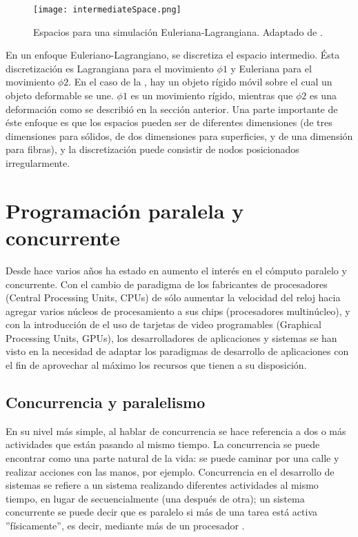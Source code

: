 \begin{figure}
	\centering
		\texttt{[image: intermediateSpace.png]}
	\caption[Espacios para una simulación Euleriana-Lagrangiana.]{Espacios para una simulación Euleriana-Lagrangiana. Adaptado de \citep{fan2013eulerian}.}
		\label{fig:intermediateSpace}
\end{figure}

En un enfoque Euleriano-Lagrangiano, se discretiza el espacio intermedio. Ésta discretización es Lagrangiana para el movimiento $\phi 1$ y Euleriana para el movimiento $\phi 2$. En el caso de la , hay un objeto rígido móvil sobre el cual un objeto deformable se une. $\phi 1$ es un movimiento rígido, mientras que $\phi 2$ es una deformación como se describió en la sección anterior. Una parte importante de éste enfoque es que los espacios pueden ser de diferentes dimensiones (de tres dimensiones para sólidos, de dos dimensiones para superficies, y de una dimensión para fibras), y la discretización puede consistir de nodos posicionados irregularmente. 

\section{Programación paralela y concurrente}

Desde hace varios años ha estado en aumento el interés en el cómputo paralelo y concurrente. Con el cambio de paradigma de los fabricantes de procesadores (Central Processing Units, CPUs) de sólo aumentar la velocidad del reloj hacia agregar varios núcleos de procesamiento a sus chips (procesadores multinúcleo), y con la introducción de el uso de tarjetas de video programables (Graphical Processing Units, GPUs), los desarrolladores de aplicaciones y sistemas se han visto en la necesidad de adaptar los paradigmas de desarrollo de aplicaciones \citep{sutter2005free} con el fin de aprovechar al máximo los recursos que tienen a su disposición. 

\subsection{Concurrencia y paralelismo}

En su nivel más simple, al hablar de concurrencia se hace referencia a dos o más actividades que están pasando al mismo tiempo. La concurrencia se puede encontrar como una parte natural de la vida: se puede caminar por una calle y realizar acciones con las manos, por ejemplo. Concurrencia en el desarrollo de sistemas se refiere a un sistema realizando diferentes actividades al mismo tiempo, en  lugar de secuencialmente (una después de otra); un sistema concurrente se puede decir que es paralelo si más de una tarea está activa ''físicamente'', es decir, mediante más de un procesador \citep{williams2012c}.

